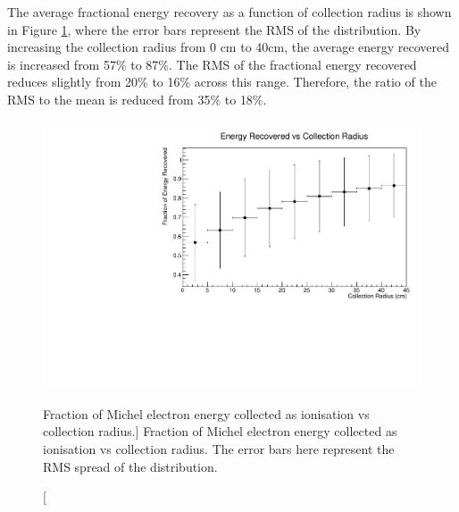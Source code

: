 The average fractional energy recovery as a function of collection radius is
shown in Figure \ref{fig:frac_v_radius}, where the error bars represent the RMS
of the distribution. By increasing the collection radius from 0 cm to 40cm,
the average energy recovered is increased from 57\% to 87\%. The RMS of the
fractional energy recovered reduces slightly from 20\% to 16\% across this
range. Therefore, the ratio of the RMS to the mean is reduced from 35\% to 
18\%.
\begin{figure}
	\centering
	\includegraphics[width=\textwidth]{figures/energy_recovery_v_radius.pdf}
	\caption
	[Fraction of Michel electron energy collected as ionisation vs collection
	radius.]
	{Fraction of Michel electron energy collected as ionisation vs collection
	radius. The error bars here represent the RMS spread of the distribution. }
	\label{fig:frac_v_radius}
\end{figure}

